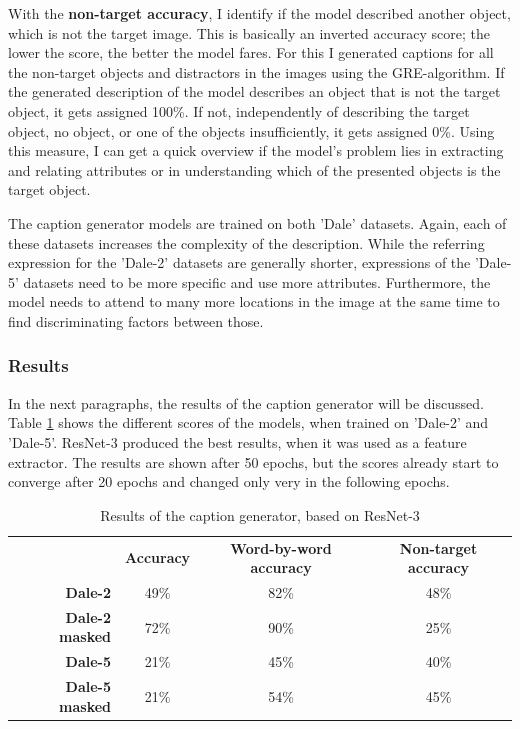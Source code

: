 With the \textbf{non-target accuracy}, I identify if the model described another object, which is not the target image.
This is basically an inverted accuracy score; the lower the score, the better the model fares.
For this I generated captions for all the non-target objects and distractors in the images using the GRE-algorithm.
If the generated description of the model describes an object that is not the target object, it gets assigned 100\%.
If not, independently of describing the target object, no object, or one of the objects insufficiently, it gets assigned 0\%.
Using this measure, I can get a quick overview if the model's problem lies in extracting and relating attributes or in understanding which of the presented objects is the target object.

The caption generator models are trained on both 'Dale' datasets.
Again, each of these datasets increases the complexity of the description.
While the referring expression for the 'Dale-2' datasets are generally shorter, expressions of the 'Dale-5' datasets need to be more specific and use more attributes.
Furthermore, the model needs to attend to many more locations in the image at the same time to find discriminating factors between those.


\subsubsection*{Results}
In the next paragraphs, the results of the caption generator will be discussed.
Table \ref{tab:results_caption-generator} shows the different scores of the models, when trained on 'Dale-2' and 'Dale-5'.
ResNet-3 produced the best results, when it was used as a feature extractor.
The results are shown after 50 epochs, but the scores already start to converge after 20 epochs and changed only very in the following epochs.

\begin{table}[h]
    \centering
    \begin{tabular}{rccc}
        \toprule
                               & \textbf{Accuracy} & \textbf{Word-by-word accuracy} & \textbf{Non-target accuracy} \\
        \textbf{Dale-2}        & 49\%              & 82\%                           & 48\%                         \\
        \textbf{Dale-2 masked} & 72\%              & 90\%                           & 25\%                         \\
        \textbf{Dale-5}        & 21\%              & 45\%                           & 40\%                         \\
        \textbf{Dale-5 masked} & 21\%              & 54\%                           & 45\%                         \\
        \bottomrule
    \end{tabular}
    \caption{Results of the caption generator, based on ResNet-3}
    \label{tab:results_caption-generator}
\end{table}

